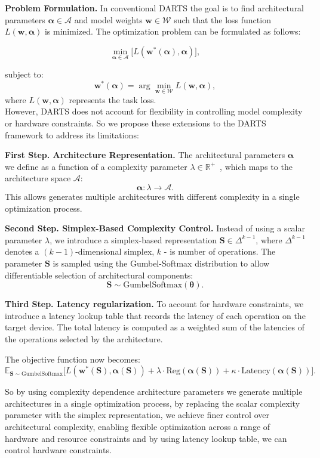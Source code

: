 \documentclass{article}
\begin{document}
\textbf{Problem Formulation.} In conventional DARTS the goal is to find architectural parameters \(\boldsymbol{\alpha} \in \mathcal{A}\) and model weights \(\boldsymbol{w} \in \mathcal{W}\) such that the loss function \(L(\boldsymbol{w}, \boldsymbol{\alpha})\) is minimized. The optimization problem can be formulated as follows:

\[
\min_{\boldsymbol{\alpha} \in \mathcal{A}} \big[L(\boldsymbol{w}^*(\boldsymbol{\alpha}), \boldsymbol{\alpha}) \big],
\]

subject to:
\[
\boldsymbol{w}^*(\boldsymbol{\alpha}) = \arg \min_{\boldsymbol{w} \in \mathcal{W}} L(\boldsymbol{w}, \boldsymbol{\alpha}),
\]
where \(L(\boldsymbol{w}, \boldsymbol{\alpha})\) represents the task loss.  \\
However, DARTS does not account for flexibility in controlling model complexity or hardware constraints. So we propose these extensions to the DARTS framework to address its limitations:

\textbf{First Step. Architecture Representation.} The architectural parameters \(\boldsymbol{\alpha}\) we define as a function of a complexity parameter \(\lambda \in \mathbb{R}^+\)~\cite{yakovlev2021neural}, which maps to the architecture space \(\mathcal{A}\):
\[
\boldsymbol{\alpha}: \lambda \to \mathcal{A}.
\]
This allows generates multiple architectures with different complexity in a single optimization process.

\textbf{Second Step. Simplex-Based Complexity Control.} Instead of using a scalar parameter \(\lambda\), we introduce a simplex-based representation \( \boldsymbol{S} \in \Delta^{k-1}\), where \(\Delta^{k-1}\) denotes a \((k-1)\)-dimensional simplex,  \(k\) - is number of operations. The parameter \(\boldsymbol{S}\) is sampled using the Gumbel-Softmax distribution to allow differentiable selection of architectural components:
\[
\boldsymbol{S} \sim \text{GumbelSoftmax}(\boldsymbol{\theta}).
\]

\textbf{Third Step. Latency regularization.} To account for hardware constraints, we introduce a latency lookup table that records the latency of each operation on the target device. The total latency is computed as a weighted sum of the latencies of the operations selected by the architecture.

The objective function now becomes:
\[
\mathbb{E}_{\boldsymbol{S} \sim \text{GumbelSoftmax}} \big[L(\boldsymbol{w}^*(\boldsymbol{S}), \boldsymbol{\alpha}(\boldsymbol{S})) + \lambda \cdot \text{Reg}(\boldsymbol{\alpha}(\boldsymbol{S})) + \kappa \cdot \text{Latency}(\boldsymbol{\alpha}(\boldsymbol{S}))\big].
\]

So by using complexity dependence architecture parameters we generate multiple architectures in a single optimization process, by replacing the scalar complexity parameter with the simplex representation, we achieve finer control over architectural complexity, enabling flexible optimization across a range of hardware and resource constraints and by using latency lookup table, we can control hardware constraints.  \\




\end{document}

